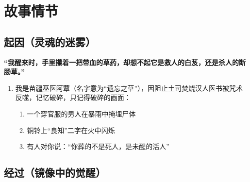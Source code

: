 \documentclass{article}
\begin{document}
	\section{故事情节}
	
	\subsection{起因（灵魂的迷雾）}
	
	\textbf{“我醒来时，手里攥着一把带血的草药，却想不起它是救人的白芨，还是杀人的断肠草。”}
	
	\begin{enumerate}[noitemsep, label={· }]
		\item 我是苗疆巫医阿蕈（名字意为“遗忘之草”），因阻止土司焚烧汉人医书被咒术反噬，记忆破碎，只记得破碎的画面：
		
			\begin{enumerate}[noitemsep, label={· }]
				\item 一个穿官服的男人在暴雨中掩埋尸体
				\item 铜铃上“良知”二字在火中闪烁
				\item 有人对你说：“你葬的不是死人，是未醒的活人”
			\end{enumerate}\textbf{}
	\end{enumerate}\textbf{}
	
	\subsection{经过（镜像中的觉醒）}
	
\end{document}
